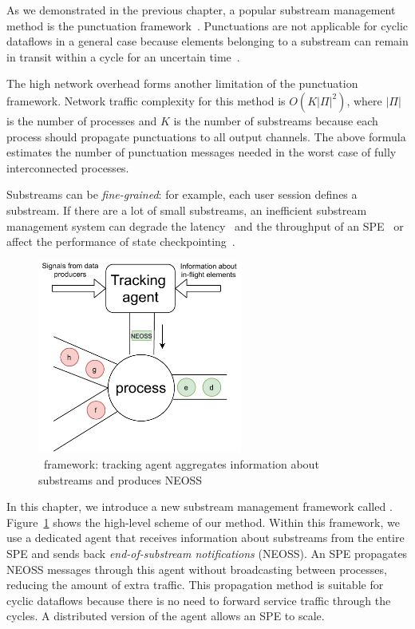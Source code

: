 As we demonstrated in the previous chapter, a popular substream management method is the punctuation framework~\cite{tucker2003exploiting}. Punctuations are not applicable for cyclic dataflows in a general case because elements belonging to a substream can remain in transit within a cycle for an uncertain time~\cite{carbone2018scalable}. 

The high network overhead forms another limitation of the punctuation framework. Network traffic complexity for this method is $O(K|\Pi|^2)$, where $|\Pi|$ is the number of processes and $K$ is the number of substreams because each process should propagate punctuations to all output channels. The above formula estimates the number of punctuation messages needed in the worst case of fully interconnected processes. 

Substreams can be {\em fine-grained}: for example, each user session defines a substream. If there are a lot of small substreams, an inefficient substream management system can degrade the latency~\cite{DBLP:journals/pvldb/BegoliACHKKMS21} and the throughput of an SPE~\cite{Li:2008:OPN:1453856.1453890} or affect the performance of state checkpointing~\cite{zhang2021research}.

\begin{figure}[t]
  \centering
  \includegraphics[width=0.60\textwidth]{Chapters/Tracker/pics/tracker-scheme.pdf}
  \caption{\tracker\ framework: tracking agent aggregates information about substreams and produces NEOSS}
  \label{tracker_scheme}
\end{figure}

In this chapter, we introduce a new substream management framework called \tracker. Figure~\ref{tracker_scheme} shows the high-level scheme of our method. 
Within this framework, we use a dedicated agent that receives information about substreams from the entire SPE and sends back {\em end-of-substream notifications} (NEOSS). 
An SPE propagates NEOSS messages through this agent without broadcasting between processes, reducing the amount of extra traffic. This propagation method is suitable for cyclic dataflows because there is no need to forward service traffic through the cycles. A distributed version of the agent allows an SPE to scale.

